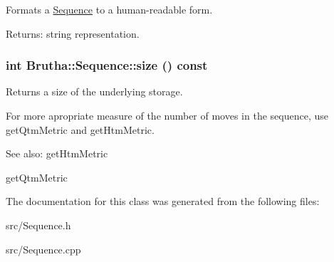 Formats a \hyperlink{classBrutha_1_1Sequence}{Sequence} to a human-readable form. 

\begin{Desc}
\item[Returns:]string representation. \end{Desc}
\hypertarget{classBrutha_1_1Sequence_9e2aa4c6db6063aff5247f2cd5e7b7df}{
\subsubsection[{size}]{\setlength{\rightskip}{0pt plus 5cm}int Brutha::Sequence::size () const}}
\label{classBrutha_1_1Sequence_9e2aa4c6db6063aff5247f2cd5e7b7df}


Returns a size of the underlying storage. 

For more apropriate measure of the number of moves in the sequence, use getQtmMetric and getHtmMetric.

\begin{Desc}
\item[See also:]getHtmMetric 

getQtmMetric \end{Desc}


The documentation for this class was generated from the following files:\begin{CompactItemize}
\item 
src/Sequence.h\item 
src/Sequence.cpp\end{CompactItemize}

